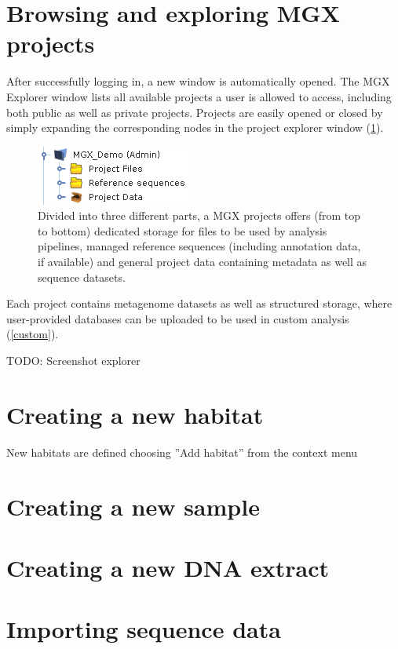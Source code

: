 \section{Browsing and exploring MGX projects}

After successfully logging in, a new window is automatically opened. The MGX Explorer window
lists all available projects a user is allowed to access, including both public as well as
private projects. Projects are easily opened or closed by simply expanding the corresponding
nodes in the project explorer window (\ref{structure}).\\

\begin{figure}[ht]
\centering
\includegraphics[width=.4\textwidth]{img/projstructure}
\caption[Project structure:]{Divided into three different parts, a MGX projects offers
(from top to bottom) dedicated storage for files to be used by analysis pipelines, 
managed reference sequences (including annotation data, if available) and general
project data containing metadata as well as sequence datasets.}
\label{structure}
\end{figure}


Each project contains metagenome datasets as well as structured storage, where user-provided
databases can be uploaded to be used in custom analysis (\ref{custom}).

TODO: Screenshot explorer

\section{Creating a new habitat}

New habitats are defined choosing ''Add habitat'' from the context menu 
\section{Creating a new sample}
\section{Creating a new DNA extract}
\section{Importing sequence data}
